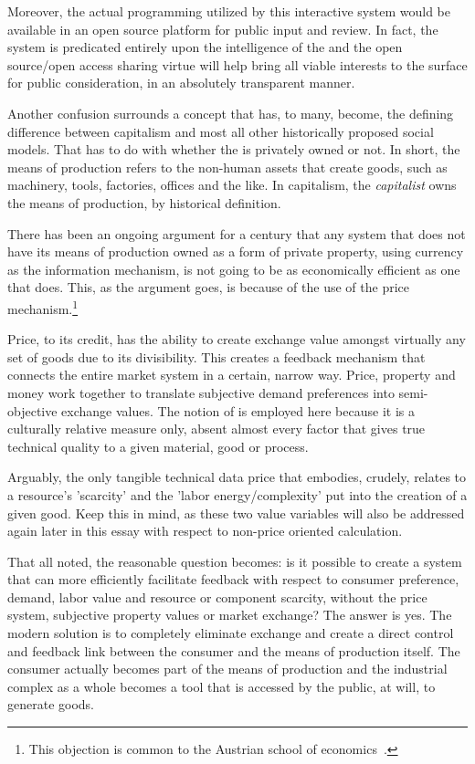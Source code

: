 \documentclass[10pt, a4paper, cleardoubleempty, openright, twoside]{book}
\begin{document}
Moreover, the actual programming utilized by this interactive system
would be available in an open source platform for public input and
review. In fact, the system is predicated entirely upon the intelligence
of the  and the open source/open access sharing
virtue will help bring all viable interests to the surface for public
consideration, in an absolutely transparent manner.

Another confusion surrounds a concept that has, to many, become, the
defining difference between capitalism and most all other historically
proposed social models. That has to do with whether the  is privately owned or not. In short, the means of
production refers to the non-human assets that create goods, such as
machinery, tools, factories, offices and the like. In capitalism, the
\emph{capitalist} owns the means of production, by historical definition.

There has been an ongoing argument for a century that any system that
does not have its means of production owned as a form of private
property, using currency as the information mechanism, is not going to
be as economically efficient as one that does. This, as the argument
goes, is because of the use of the price mechanism.\footnote{
	This objection is common to the Austrian school of
	economics~\cite{Mises:http:20}.
}

Price, to its credit, has the ability to create exchange value amongst
virtually any set of goods due to its divisibility. This creates a
feedback mechanism that connects the entire market system in a certain,
narrow way. Price, property and money work together to translate
subjective demand preferences into semi-objective exchange values. The
notion of  is employed here because it is a culturally
relative measure only, absent almost every factor that gives true
technical quality to a given material, good or process.

Arguably, the only tangible technical data price that embodies, crudely,
relates to a resource's 'scarcity' and the 'labor energy/complexity' put
into the creation of a given good. Keep this in mind, as these two value
variables will also be addressed again later in this essay with respect
to non-price oriented calculation.

That all noted, the reasonable question becomes: is it possible to
create a system that can more efficiently facilitate feedback with
respect to consumer preference, demand, labor value and resource or
component scarcity, without the price system, subjective property values
or market exchange? The answer is yes. The modern solution is to
completely eliminate exchange and create a direct control and feedback
link between the consumer and the means of production itself. The
consumer actually becomes part of the means of production and the
industrial complex as a whole becomes a tool that is accessed by the
public, at will, to generate goods.
\end{document}
